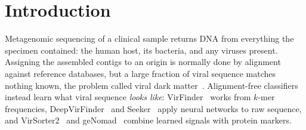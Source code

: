 \documentclass[10pt,twocolumn,a4paper]{article}
\begin{document}

\section{Introduction}

Metagenomic sequencing of a clinical sample returns DNA from everything the
specimen contained: the human host, its bacteria, and any viruses present.
Assigning the assembled contigs to an origin is normally done by alignment
against reference databases, but a large fraction of viral sequence matches
nothing known, the problem called viral dark
matter~\cite{krishnamurthy2017darkmatter}. Alignment-free classifiers instead
learn what viral sequence \emph{looks like}: VirFinder~\cite{ren2017virfinder}
works from $k$-mer frequencies, DeepVirFinder~\cite{ren2020deepvirfinder} and
Seeker~\cite{auslander2020seeker} apply neural networks to raw sequence, and
VirSorter2~\cite{guo2021virsorter2} and geNomad~\cite{camargo2024genomad}
combine learned signals with protein markers.
\end{document}
